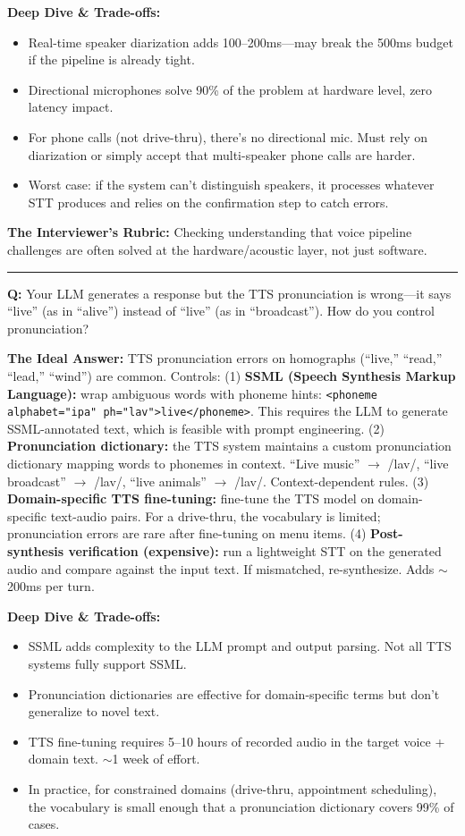 \textbf{Deep Dive \& Trade-offs:}
\begin{itemize}
  \item Real-time speaker diarization adds 100--200ms---may break the 500ms budget if the pipeline is already tight.
  \item Directional microphones solve 90\% of the problem at hardware level, zero latency impact.
  \item For phone calls (not drive-thru), there's no directional mic. Must rely on diarization or simply accept that multi-speaker phone calls are harder.
  \item Worst case: if the system can't distinguish speakers, it processes whatever STT produces and relies on the confirmation step to catch errors.
\end{itemize}

\textbf{The Interviewer's Rubric:} Checking understanding that voice pipeline challenges are often solved at the hardware/acoustic layer, not just software.

\bigskip\hrule\bigskip

\textbf{Q:} Your LLM generates a response but the TTS pronunciation is wrong---it says ``live'' (as in ``alive'') instead of ``live'' (as in ``broadcast''). How do you control pronunciation?

\textbf{The Ideal Answer:} TTS pronunciation errors on homographs (``live,'' ``read,'' ``lead,'' ``wind'') are common. Controls: (1) \textbf{SSML (Speech Synthesis Markup Language):} wrap ambiguous words with phoneme hints: \texttt{<phoneme alphabet="ipa" ph="la\textsci v">live</phoneme>}. This requires the LLM to generate SSML-annotated text, which is feasible with prompt engineering. (2) \textbf{Pronunciation dictionary:} the TTS system maintains a custom pronunciation dictionary mapping words to phonemes in context. ``Live music'' $\rightarrow$ /la\textsci v/, ``live broadcast'' $\rightarrow$ /la\textsci v/, ``live animals'' $\rightarrow$ /la\textsci v/. Context-dependent rules. (3) \textbf{Domain-specific TTS fine-tuning:} fine-tune the TTS model on domain-specific text-audio pairs. For a drive-thru, the vocabulary is limited; pronunciation errors are rare after fine-tuning on menu items. (4) \textbf{Post-synthesis verification (expensive):} run a lightweight STT on the generated audio and compare against the input text. If mismatched, re-synthesize. Adds $\sim$200ms per turn.

\textbf{Deep Dive \& Trade-offs:}
\begin{itemize}
  \item SSML adds complexity to the LLM prompt and output parsing. Not all TTS systems fully support SSML.
  \item Pronunciation dictionaries are effective for domain-specific terms but don't generalize to novel text.
  \item TTS fine-tuning requires 5--10 hours of recorded audio in the target voice + domain text. $\sim$1 week of effort.
  \item In practice, for constrained domains (drive-thru, appointment scheduling), the vocabulary is small enough that a pronunciation dictionary covers 99\% of cases.
\end{itemize}

